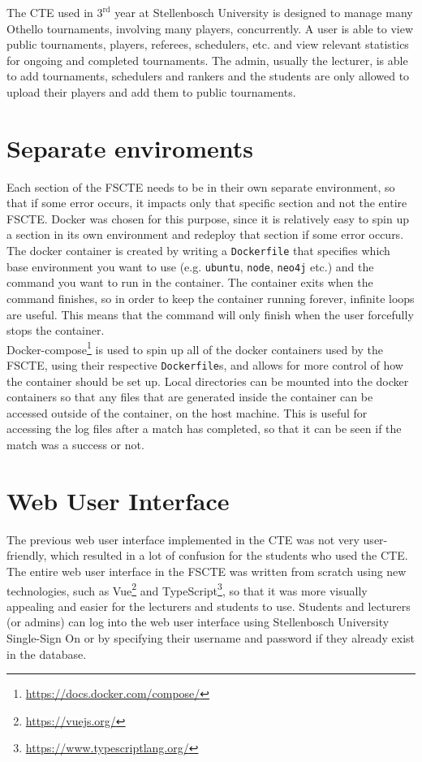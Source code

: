 \documentclass[a4paper, 11pt]{report}
\begin{document}
The CTE used in $3^{\text{rd}}$ year at Stellenbosch
University is designed to manage many Othello \cite{othello} tournaments,
involving many players, concurrently. A user is able to view public tournaments,
players, referees, schedulers, etc. and view relevant statistics for
ongoing and completed tournaments. The admin, usually the lecturer, is
able to add tournaments, schedulers and rankers and the students are only allowed
to upload their players and add them to public tournaments.

\section{Separate enviroments}

Each section of the FSCTE needs to be in their own separate environment, so that
if some error occurs, it impacts only that specific section and not the entire
FSCTE. Docker was chosen for this purpose, since it is relatively easy to spin
up a section in its own environment and redeploy that section if some error
occurs. \\

The docker container is created by writing a \texttt{Dockerfile} that
specifies which base environment you want to use (e.g. \texttt{ubuntu},
\texttt{node}, \texttt{neo4j} etc.) and the command you want to run in the
container. The container exits when the command finishes, so in order to keep
the container running forever, infinite loops are useful. This means that the
command will only finish when the user forcefully stops the container. \\

Docker-compose\footnote{\url{https://docs.docker.com/compose/}} is used to spin
up all of the docker containers used by the FSCTE,
using their respective \texttt{Dockerfile}s, and allows for more control of how
the container should be set up. Local directories can be mounted into the docker
containers so that any files that are generated inside the container can be
accessed outside of the container, on the host machine. This is useful for
accessing the log files after a match has completed, so that it can be seen if
the match was a success or not.

\section{Web User Interface}

The previous web user interface implemented in the CTE was not very user-friendly,
which resulted in a lot of confusion for the students who used the CTE. The entire
web user interface in the FSCTE was written from scratch using new technologies,
such as Vue\footnote{\url{https://vuejs.org/}} and
TypeScript\footnote{\url{https://www.typescriptlang.org/}}, so that it was more
visually appealing and easier for the lecturers and students to use. Students
and lecturers (or admins) can log into the web user interface using Stellenbosch
University Single-Sign On or by specifying their username and password if they
already exist in the database. \\
\end{document}
